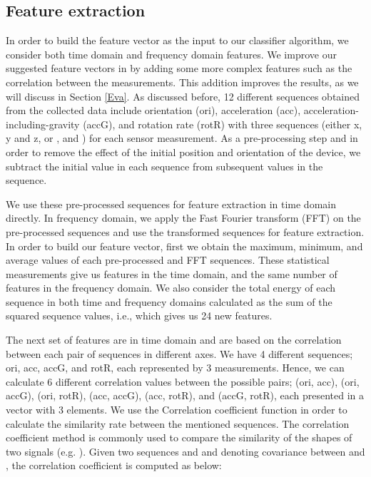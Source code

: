 \documentclass[10pt,twocolumn]{article}
\begin{document}
\subsection{Feature extraction}
In order to build the feature vector as the input to our classifier algorithm, we consider both time domain and frequency domain features. We improve our suggested feature vectors in \cite{Mehrnezhad} by adding some more complex features such as the correlation between the measurements. This addition 
improves the results, as we will discuss in Section \ref{Eva}.
As discussed before, 12 different sequences obtained from the collected data include
orientation (ori), acceleration (acc), acceleration-including-gravity (accG), and rotation rate (rotR)
with three sequences (either x, y and z, or ,  and ) for each sensor measurement. 
As a pre-processing step and in order to remove the effect of the initial position and orientation of the device, we subtract the initial value in each sequence from subsequent values in the sequence. 


We use these pre-processed sequences for feature extraction in time domain directly. In frequency domain, we apply the Fast Fourier transform (FFT) on the pre-processed sequences and use the transformed sequences for feature extraction.  
In order to build our feature vector, first we obtain the maximum, minimum, and average values of each pre-processed and FFT sequences. These statistical measurements give us  features in the time domain, and the same number of features in the frequency domain.
We also consider the total energy of each sequence in both time and frequency domains calculated as the sum of the squared sequence values, i.e.,  which gives us 24 new features. 

The next set of features are in time domain and are based on the correlation between each pair of sequences in different axes. We have 4 different sequences; ori, acc, accG, and rotR, each represented by 3 measurements. Hence, we can calculate 6 different correlation values between the possible pairs; (ori, acc), (ori, accG), (ori, rotR), (acc, accG), (acc, rotR), and (accG, rotR), each presented in a vector with 3 elements. We use the Correlation coefficient function in order to calculate the similarity rate between the mentioned sequences. The correlation coefficient method is commonly used to compare the similarity of the shapes of two signals (e.g. \cite{Shake4}). 
Given two sequences  and  and  denoting covariance between  and , the correlation coefficient is computed as below: 
\end{document}
